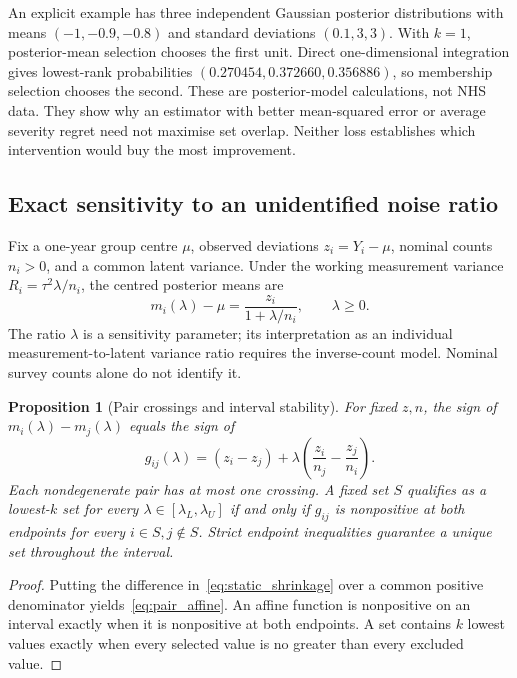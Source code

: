 \documentclass[11pt,letterpaper]{article}
\newtheorem{proposition}{Proposition}
\begin{document}
An explicit example has three independent Gaussian posterior distributions with means $(-1,-0.9,-0.8)$ and standard deviations $(0.1,3,3)$. With $k=1$, posterior-mean selection chooses the first unit. Direct one-dimensional integration gives lowest-rank probabilities $(0.270454,0.372660,0.356886)$, so membership selection chooses the second. These are posterior-model calculations, not NHS data. They show why an estimator with better mean-squared error or average severity regret need not maximise set overlap. Neither loss establishes which intervention would buy the most improvement.

\subsection{Exact sensitivity to an unidentified noise ratio}
Fix a one-year group centre $\mu$, observed deviations $z_i=Y_i-\mu$, nominal counts $n_i>0$, and a common latent variance. Under the working measurement variance $R_i=\tau^2\lambda/n_i$, the centred posterior means are
\begin{equation}
 m_i(\lambda)-\mu=\frac{z_i}{1+\lambda/n_i},\qquad\lambda\ge0.
 \label{eq:static_shrinkage}
\end{equation}
The ratio $\lambda$ is a sensitivity parameter; its interpretation as an individual measurement-to-latent variance ratio requires the inverse-count model. Nominal survey counts alone do not identify it.
\begin{proposition}[Pair crossings and interval stability]\label{prop:crossing}
For fixed $z,n$, the sign of $m_i(\lambda)-m_j(\lambda)$ equals the sign of
\begin{equation}
 g_{ij}(\lambda)=(z_i-z_j)+\lambda\left(\frac{z_i}{n_j}-\frac{z_j}{n_i}\right).
 \label{eq:pair_affine}
\end{equation}
Each nondegenerate pair has at most one crossing. A fixed set $S$ qualifies as a lowest-$k$ set for every $\lambda\in[\lambda_L,\lambda_U]$ if and only if $g_{ij}$ is nonpositive at both endpoints for every $i\in S,j\notin S$. Strict endpoint inequalities guarantee a unique set throughout the interval.
\end{proposition}
\begin{proof}
Putting the difference in~\eqref{eq:static_shrinkage} over a common positive denominator yields~\eqref{eq:pair_affine}. An affine function is nonpositive on an interval exactly when it is nonpositive at both endpoints. A set contains $k$ lowest values exactly when every selected value is no greater than every excluded value.
\end{proof}
\end{document}
